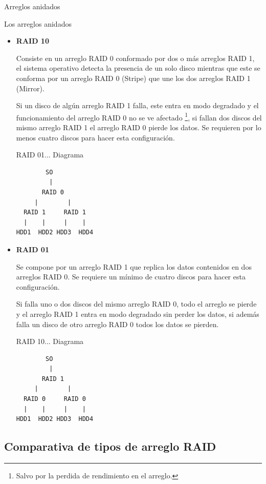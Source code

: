 Arreglos anidados

Los arreglos anidados \cite{3e1f0dad689a7971f226a3ded845ae63}

\begin{itemize}

  \item \textbf{RAID 10}

Consiste en un arreglo RAID 0 conformado por dos o m\'{a}s arreglos RAID 1, el sistema operativo detecta la presencia de un solo disco mientras que este se conforma por un arreglo RAID 0 (Stripe) que une los dos arreglos RAID 1 (Mirror).

Si un disco de alg\'{u}n arreglo RAID 1 falla, este entra en modo degradado y el funcionamiento del arreglo RAID 0 no se ve afectado \footnote{Salvo por la perdida de rendimiento en el arreglo.}, si fallan dos discos del mismo arreglo RAID 1 el arreglo RAID 0 pierde los datos. Se requieren por lo menos cuatro discos para hacer esta configuraci\'{o}n.

RAID 01... Diagrama \cite{3638d46cd02c0cd72e333c6d6f8f9608}
\begin{verbatim}
        SO
         |
       RAID 0
     |        |
  RAID 1     RAID 1
  |    |     |    |
HDD1  HDD2 HDD3  HDD4
\end{verbatim}
  

  \item \textbf{RAID 01}

Se compone por un arreglo RAID 1 que replica los datos contenidos en dos arreglos RAID 0. Se requiere un m\'{i}nimo de cuatro discos para hacer esta configuraci\'{o}n.

Si falla uno o dos discos del mismo arreglo RAID 0, todo el arreglo se pierde y el arreglo RAID 1 entra en modo degradado sin perder los datos, si adem\'{a}s falla un disco de otro arreglo RAID 0 todos los datos se pierden.
  
RAID 10... Diagrama \cite{9b286bf9442c2cf4d1e02ddf7322c92b}
\begin{verbatim}
        SO
         |
       RAID 1
     |        |
  RAID 0     RAID 0
  |    |     |    |
HDD1  HDD2 HDD3  HDD4
\end{verbatim}
  
\end{itemize}

      \subsection {Comparativa de tipos de arreglo RAID}

